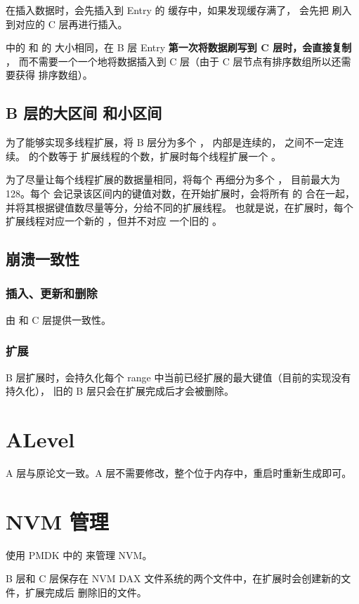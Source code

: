 \documentclass{mydoc}
\begin{document}
在插入数据时，会先插入到 Entry 的  缓存中，如果发现缓存满了，
会先把  刷入到对应的 C 层再进行插入。

 中的  和  的 
大小相同，在 B 层 Entry \textbf{第一次将数据刷写到 C 层时，会直接复制 }，
而不需要一个一个地将数据插入到 C 层（由于 C 层节点有排序数组所以还需要获得
排序数组）。

\subsection{B 层的大区间  和小区间 }

为了能够实现多线程扩展，将 B 层分为多个 ，
内部是连续的， 之间不一定连续。 的个数等于
扩展线程的个数，扩展时每个线程扩展一个 。

为了尽量让每个线程扩展的数据量相同，将每个  再细分为多个
， 目前最大为 128。每个 
会记录该区间内的键值对数，在开始扩展时，会将所有  的
 合在一起，并将其根据键值数尽量等分，分给不同的扩展线程。
也就是说，在扩展时，每个扩展线程对应一个新的 ，但并不对应
一个旧的 。

\subsection{崩溃一致性}

\subsubsection{插入、更新和删除}

由  和 C 层提供一致性。

\subsubsection{扩展}

B 层扩展时，会持久化每个 range 中当前已经扩展的最大键值（目前的实现没有持久化），
旧的 B 层只会在扩展完成后才会被删除。

\section{ALevel}

A 层与原论文一致。A 层不需要修改，整个位于内存中，重启时重新生成即可。

\section{NVM 管理}

使用 PMDK 中的  来管理 NVM。

B 层和 C 层保存在 NVM DAX 文件系统的两个文件中，在扩展时会创建新的文件，扩展完成后
删除旧的文件。
\end{document}
